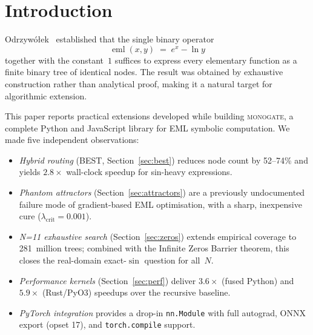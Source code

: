 \documentclass[11pt,a4paper]{article}
\begin{document}
\begin{abstract}
Two further extensions (v0.10.0) are included:
\textbf{Complex BEST routing} extends the BEST dispatcher to $\mathbb{C}$,
recovering $\sin(x)$ and $\cos(x)$ at \textbf{1 node each} via the Euler
path $\operatorname{Im}(e^{ix})=\sin x$, and finding near-exact complex EML
constructions for Bessel $J_0$, erf, and Airy Ai via MCTS.
\textbf{Physics-informed EML networks (EMLPINN)} augment EMLNetwork training
with an ODE/PDE residual loss (harmonic oscillator, steady Burgers, heat
equation), producing interpretable symbolic approximate solutions.
A comprehensive theory document, formal conjectures, and full reproducibility
infrastructure are provided in \texttt{THEORY.md} at the repository root.

Source code, data, and the interactive explorer are available at
\url{https://github.com/agent-maestro/monogate}.
\end{abstract}

\section{Introduction}
\label{sec:intro}

Odrzyw\'{o}\l{}ek~\cite{odrzywolekEML2026} established that the single
binary operator
\[
  \operatorname{eml}(x,y) \;=\; e^x - \ln y
\]
together with the constant~$1$ suffices to express every elementary
function as a finite binary tree of identical nodes.
The result was obtained by exhaustive construction rather than
analytical proof, making it a natural target for algorithmic extension.

This paper reports practical extensions developed while building
\textsc{monogate}, a complete Python and JavaScript library for EML
symbolic computation.
We made five independent observations:

\begin{itemize}
  \item \emph{Hybrid routing} (BEST, Section~\ref{sec:best}) reduces
    node count by 52--74\% and yields $2.8\times$ wall-clock speedup
    for sin-heavy expressions.
  \item \emph{Phantom attractors} (Section~\ref{sec:attractors}) are a
    previously undocumented failure mode of gradient-based EML
    optimisation, with a sharp, inexpensive cure
    ($\lambda_{\text{crit}}=0.001$).
  \item \emph{N=11 exhaustive search} (Section~\ref{sec:zeros}) extends
    empirical coverage to 281~million trees; combined with the Infinite
    Zeros Barrier theorem, this closes the real-domain exact-$\sin$
    question for all~$N$.
  \item \emph{Performance kernels} (Section~\ref{sec:perf}) deliver
    $3.6\times$ (fused Python) and $5.9\times$ (Rust/PyO3) speedups
    over the recursive baseline.
  \item \emph{PyTorch integration} provides a drop-in \texttt{nn.Module}
    with full autograd, ONNX export (opset 17), and
    \texttt{torch.compile} support.
\end{itemize}
\end{document}
